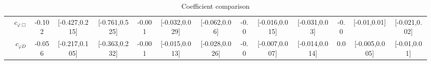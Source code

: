 \documentclass{article}
\begin{document}
\begin{table}[H]
\begin{tabular}{|c|c|c|c|c|c|c|c|c|c|c|c|c|c|}
 & $c_{\varphi \Box}$ & -0.102                             & [-0.427,0.215]                                 & [-0.761,0.525] & -0.001                             & [-0.032,0.029]                                 & [-0.062,0.06] & -0.0                             & [-0.016,0.015]                                 & [-0.031,0.03] & -0.0                             & [-0.01,0.01]                                 & [-0.021,0.02] \\ \cline{2-14}
 & $c_{\varphi D}$ & -0.056                             & [-0.217,0.105]                                 & [-0.363,0.232] & -0.001                             & [-0.015,0.013]                                 & [-0.028,0.026] & -0.0                             & [-0.007,0.007]                                 & [-0.014,0.014] & 0.0                             & [-0.005,0.005]                                 & [-0.01,0.01] \\ \cline{2-14}
\hline
\end{tabular}
\caption{Coefficient comparison}
\end{table}
\end{document}
